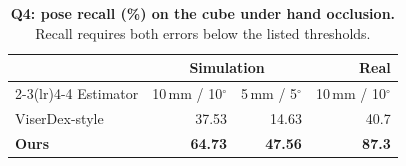 \begin{table}[!htbp]
\centering\small
\setlength{\tabcolsep}{4pt}
\begin{tabular}{lrrr}
\toprule
 & \multicolumn{2}{c}{Simulation} & Real\\
\cmidrule(lr){2-3}\cmidrule(lr){4-4}
Estimator & 10\,mm / 10$^\circ$ & 5\,mm / 5$^\circ$ & 10\,mm / 10$^\circ$\\
\midrule
ViserDex-style & 37.53 & 14.63 & 40.7\\
\textbf{Ours} & \textbf{64.73} & \textbf{47.56} & \textbf{87.3}\\
\bottomrule
\end{tabular}
\caption{\textbf{Q4: pose recall (\%) on the cube under hand occlusion.} Recall requires both errors below the listed thresholds.}
\label{tab:pose-summary}
\end{table}
